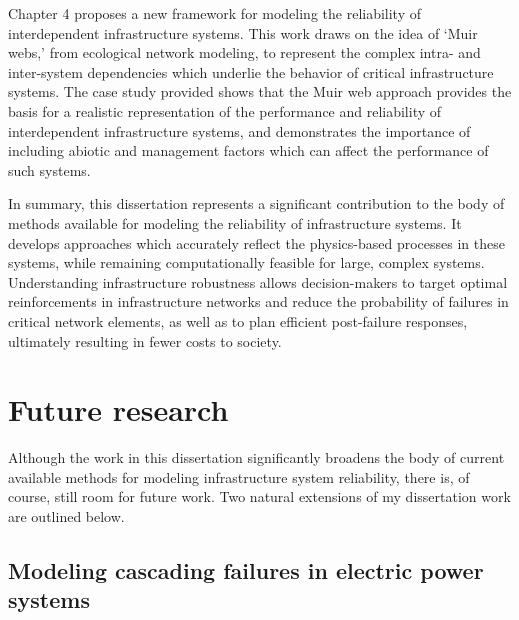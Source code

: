 Chapter 4 proposes a new framework for modeling the reliability of interdependent infrastructure systems.  This work draws on the idea of `Muir webs,' from ecological network modeling, to represent the complex intra- and inter-system dependencies which underlie the behavior of critical infrastructure systems. The case study provided shows that the Muir web approach provides the basis for a realistic representation of the performance and reliability of interdependent infrastructure systems, and demonstrates the importance of including abiotic and management factors which can affect the performance of such systems.

In summary, this dissertation represents a significant contribution to the body of methods available for modeling the reliability of infrastructure systems. It develops approaches which accurately reflect the physics-based processes in these systems, while remaining computationally feasible for large, complex systems. Understanding infrastructure robustness allows decision-makers to target optimal reinforcements in infrastructure networks and reduce the probability of failures in critical network elements, as well as to plan efficient post-failure responses, ultimately resulting in fewer costs to society.


\section{Future research}
\label{sec:ch5:future}

Although the work in this dissertation significantly broadens the body of current available methods for modeling infrastructure system reliability, there is, of course, still room for future work.  Two natural extensions of my dissertation work are outlined below.

\subsection{Modeling cascading failures in electric power systems}
\label{sec:ch5:future:cascades}

